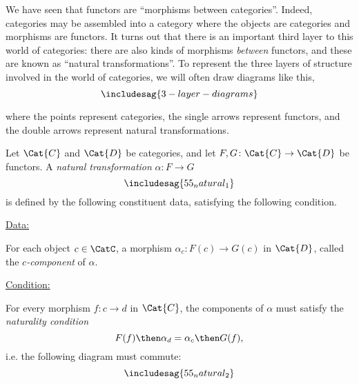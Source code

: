 
We have seen that functors are ``morphisms between categories''. Indeed, categories may be assembled into a category  where the objects are categories and morphisms are functors. It turns out that there is an important third layer to this world of categories: there are also kinds of morphisms \emph{between} functors, and these are known as ``natural transformations''. To represent the three layers of structure involved in the world of categories, we will often draw diagrams like this,
\begin{equation}
    \includesag{3-layer-diagrams}
\end{equation}


where the points represent categories, the single arrows represent functors, and the double arrows represent natural transformations.


\begin{ctdefinition}
    Let $\Cat{C}$ and $\Cat{D}$ be categories, and let $F,G\colon \Cat{C}\to \Cat{D}$ be functors. A \emph{natural transformation} $\alpha\colon F\to G$
    \begin{equation}
        \includesag{55_natural_1}
    \end{equation}
    is defined by the following constituent data, satisfying the following condition.

    \underline{Data:}
    \begin{compactenum}
        \item For each object $c\in \CatC$, a morphism $\alpha_c\colon F(c)\to G(c)$ in $\Cat{D}$, called the $c$\emph{-component} of $\alpha$.
    \end{compactenum}
    \underline{Condition:}
    \begin{compactenum}
        \item For every morphism $f\colon c\to d$ in $\Cat{C}$, the components of $\alpha$ must satisfy the \emph{naturality condition}
        \begin{equation}
            F(f)\then \alpha_d = \alpha_c\then G(f),
        \end{equation}
        i.e. the following diagram must commute:
        \begin{equation}
            \includesag{55_natural_2}
        \end{equation}
    \end{compactenum}
\end{ctdefinition}

